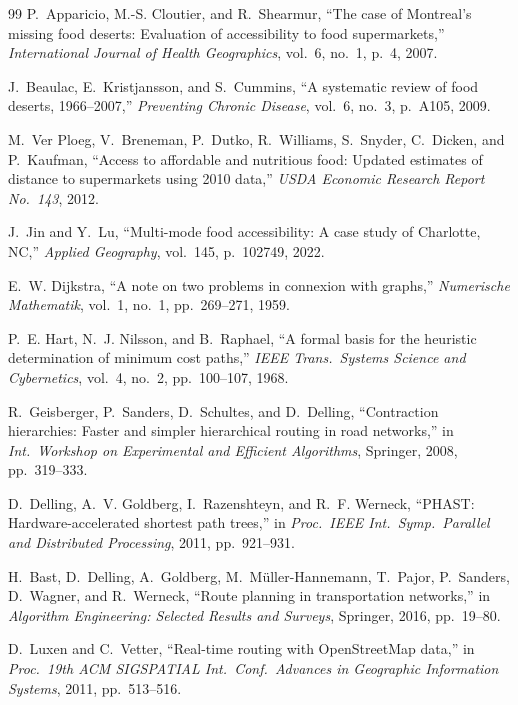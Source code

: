 \documentclass[conference]{IEEEtran}
\begin{document}
\begin{thebibliography}{99}
P.~Apparicio, M.-S. Cloutier, and R.~Shearmur, ``The case of
Montreal's missing food deserts: Evaluation of accessibility to food
supermarkets,'' \textit{International Journal of Health Geographics},
vol.~6, no.~1, p.~4, 2007.

J.~Beaulac, E.~Kristjansson, and S.~Cummins, ``A systematic review of
food deserts, 1966--2007,'' \textit{Preventing Chronic Disease},
vol.~6, no.~3, p.~A105, 2009.

M.~Ver Ploeg, V.~Breneman, P.~Dutko, R.~Williams, S.~Snyder,
C.~Dicken, and P.~Kaufman, ``Access to affordable and nutritious food:
Updated estimates of distance to supermarkets using 2010 data,''
\textit{USDA Economic Research Report No.~143}, 2012.

J.~Jin and Y.~Lu, ``Multi-mode food accessibility: A case study of
Charlotte, NC,'' \textit{Applied Geography}, vol.~145, p.~102749, 2022.

E.~W. Dijkstra, ``A note on two problems in connexion with graphs,''
\textit{Numerische Mathematik}, vol.~1, no.~1, pp.~269--271, 1959.

P.~E. Hart, N.~J. Nilsson, and B.~Raphael, ``A formal basis for the
heuristic determination of minimum cost paths,'' \textit{IEEE Trans.\
Systems Science and Cybernetics}, vol.~4, no.~2, pp.~100--107, 1968.

R.~Geisberger, P.~Sanders, D.~Schultes, and D.~Delling, ``Contraction
hierarchies: Faster and simpler hierarchical routing in road networks,''
in \textit{Int.\ Workshop on Experimental and Efficient Algorithms},
Springer, 2008, pp.~319--333.

D.~Delling, A.~V. Goldberg, I.~Razenshteyn, and R.~F. Werneck,
``PHAST: Hardware-accelerated shortest path trees,'' in \textit{Proc.\
IEEE Int.\ Symp.\ Parallel and Distributed Processing}, 2011,
pp.~921--931.

H.~Bast, D.~Delling, A.~Goldberg, M.~M\"{u}ller-Hannemann, T.~Pajor,
P.~Sanders, D.~Wagner, and R.~Werneck, ``Route planning in
transportation networks,'' in \textit{Algorithm Engineering: Selected
Results and Surveys}, Springer, 2016, pp.~19--80.

D.~Luxen and C.~Vetter, ``Real-time routing with OpenStreetMap data,''
in \textit{Proc.\ 19th ACM SIGSPATIAL Int.\ Conf.\ Advances in
Geographic Information Systems}, 2011, pp.~513--516.


\end{thebibliography}
\end{document}
